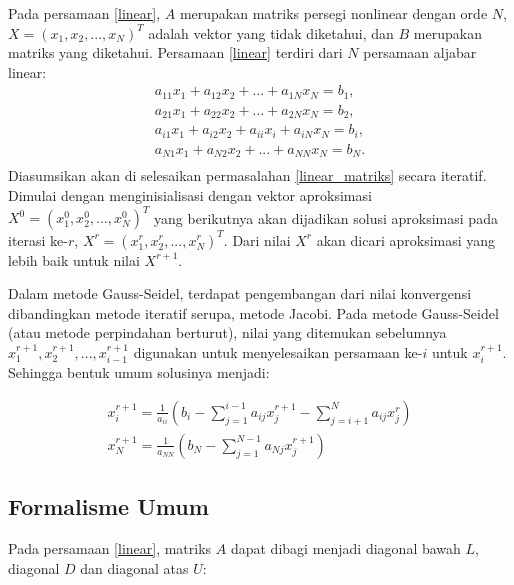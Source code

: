 Pada persamaan \eqref{linear}, $A$ merupakan matriks persegi nonlinear dengan orde $N$, $X = (x_1, x_2, ..., x_N)^T$ adalah vektor yang tidak diketahui, dan $B$ merupakan matriks yang diketahui. Persamaan \eqref{linear} terdiri dari $N$ persamaan aljabar linear:
\begin{equation}\label{linear_matriks}
    \begin{split}
        a_{11}x_1 + a_{12}x_2 +        ...       + a_{1N}x_N = b_1,\\
        a_{21}x_1 + a_{22}x_2 +        ...       + a_{2N}x_N = b_2,\\
        a_{i1}x_1 + a_{i2}x_2 +    a_{ii}x_i     + a_{iN}x_N = b_i,\\
        a_{N1}x_1 + a_{N2}x_2 +        ...       + a_{NN}x_N = b_N.\\
    \end{split}
\end{equation}
Diasumsikan akan di selesaikan permasalahan \eqref{linear_matriks} secara iteratif. Dimulai dengan menginisialisasi dengan vektor aproksimasi $X^0 = (x_1^0, x_2^0, ..., x_N^0)^T$ yang berikutnya akan dijadikan solusi aproksimasi pada iterasi ke-$r$, $X^r = (x_1^r, x_2^r, ..., x_N^r)^T$. Dari nilai $X^r$ akan dicari aproksimasi yang lebih baik untuk nilai $X^{r+1}$.

Dalam metode Gauss-Seidel, terdapat pengembangan dari nilai konvergensi dibandingkan metode iteratif serupa, metode Jacobi. Pada metode Gauss-Seidel (atau metode perpindahan berturut), nilai yang ditemukan sebelumnya $x_1^{r+1}, x_2^{r+1}, ..., x_{i-1}^{r+1}$ digunakan untuk menyelesaikan persamaan ke-$i$ untuk $x_i^{r+1}$. Sehingga bentuk umum solusinya menjadi: 

\begin{equation}\label{konfigurasi gauss seidel}
    \begin{split}
        x_i^{r+1} = \frac{1}{a_{ii}} \left(b_i-\sum_{j=1}^{i-1}a_{ij}x_j^{r+1} - \sum_{j=i+1}^N a_{ij}x_j^r \right)\\
        x_N^{r+1} = \frac{1}{a_{NN}} \left(b_N-\sum_{j=1}^{N-1}a_{Nj}x_j^{r+1}\right)
    \end{split}
\end{equation}

\subsection{Formalisme Umum}

Pada persamaan \eqref{linear}, matriks $A$ dapat dibagi menjadi diagonal bawah $L$, diagonal $D$ dan diagonal atas $U$:

